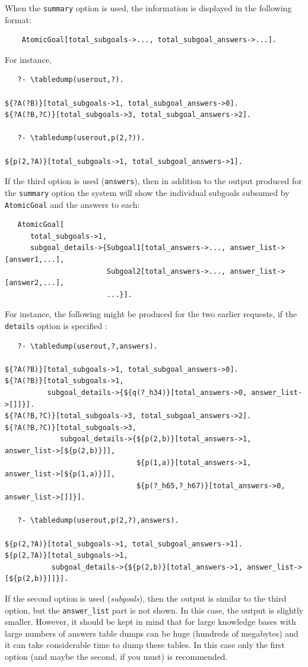 \documentclass[11pt]{article}
\begin{document}
\noindent
When the \texttt{summary}  option is used, the information is displayed in the
following format:
\begin{verbatim}
    AtomicGoal[total_subgoals->..., total_subgoal_answers->...].
\end{verbatim}
For instance,
\begin{verbatim}
   ?- \tabledump(userout,?).

${?A(?B)}[total_subgoals->1, total_subgoal_answers->0].
${?A(?B,?C)}[total_subgoals->3, total_subgoal_answers->2].

   ?- \tabledump(userout,p(2,?)).

${p(2,?A)}[total_subgoals->1, total_subgoal_answers->1].
\end{verbatim}
If the third option is used (\texttt{answers}),
then in addition to the output
produced for the \texttt{summary} option the system will show the
individual subgoals subsumed by \texttt{AtomicGoal} and the answers to
each:
\begin{verbatim}
   AtomicGoal[
      total_subgoals->1,
      subgoal_details->{Subgoal1[total_answers->..., answer_list->[answer1,...],
                        Subgoal2[total_answers->..., answer_list->[answer2,...],
                        ...}].
\end{verbatim}
For instance, the following might be produced for the two earlier requests,
if the \texttt{details} option is specified :
{\small
\begin{verbatim}
   ?- \tabledump(userout,?,answers).

${?A(?B)}[total_subgoals->1, total_subgoal_answers->0].
${?A(?B)}[total_subgoals->1,
          subgoal_details->{${q(?_h34)}[total_answers->0, answer_list->[]]}].
${?A(?B,?C)}[total_subgoals->3, total_subgoal_answers->2].
${?A(?B,?C)}[total_subgoals->3,
             subgoal_details->{${p(2,b)}[total_answers->1, answer_list->[${p(2,b)}]],
                               ${p(1,a)}[total_answers->1, answer_list->[${p(1,a)}]],
                               ${p(?_h65,?_h67)}[total_answers->0, answer_list->[]]}].

   ?- \tabledump(userout,p(2,?),answers).

${p(2,?A)}[total_subgoals->1, total_subgoal_answers->1].
${p(2,?A)}[total_subgoals->1,
           subgoal_details->{${p(2,b)}[total_answers->1, answer_list->[${p(2,b)}]]}].
\end{verbatim}
  }
If the second option is used (\emph{subgoals}), then the output is similar
to the third option, but the \texttt{answer\_list} part is not shown.  In
this case, the output is slightly smaller. However, it should be kept in
mind that for large knowledge bases with large numbers
of answers table dumps can
be huge (hundreds of megabytes) and it can take
considerable time to dump these tables. In this case only the first option
(and maybe the second, if you must) is recommended.
\end{document}
